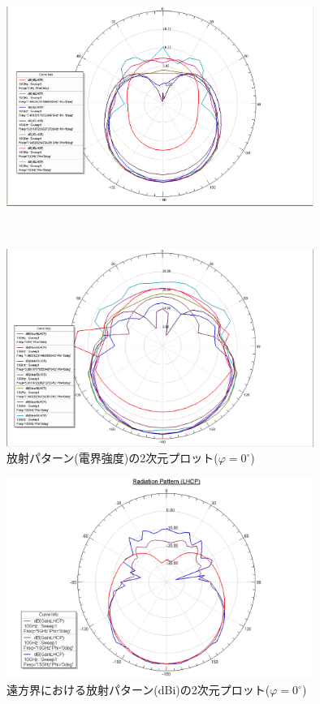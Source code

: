\documentclass[11pt,a4paper,uplatex]{ujarticle}
\begin{document}
  \clearpage
  \begin{figure}[tbp]
    \centering
    \begin{minipage}[b]{0.995\textwidth}
      \centering
      \includegraphics[keepaspectratio, width=100mm]{Images/rad_pattern_far.png}
    \end{minipage}\\
    \begin{minipage}[b]{0.995\textwidth}
      \centering
      \includegraphics[keepaspectratio, width=100mm]{Images/rad_pattern_near.png}
    \end{minipage}
    \caption{放射パターン(電界強度)の2次元プロット($\varphi = 0^\circ$)}\label{fig:radiation_pattern_2D}
  \end{figure}
  \begin{figure}[hbtp]
    \centering
    \includegraphics[keepaspectratio, width=100mm]{Images/radiation_pattern_lhcp.png}
    \caption{遠方界における放射パターン(dBi)の2次元プロット($\varphi = 0^\circ$)}
    \label{fig:radiation_pattern_lhcp}
  \end{figure}
\end{document}
